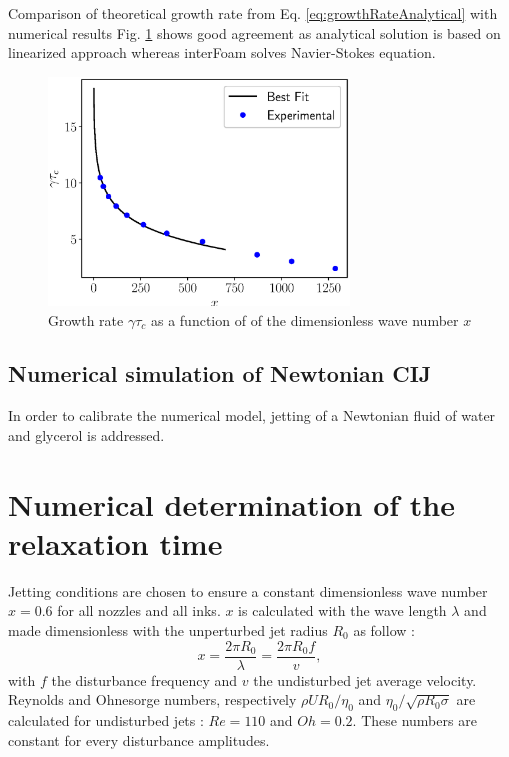 \documentclass[twocolumn,10pt]{asme2ej}
\begin{document}
Comparison of theoretical growth rate from Eq. \ref{eq:growthRateAnalytical} with numerical results Fig. \ref{fig:growthrate} shows good agreement as analytical solution is based on linearized approach whereas interFoam solves Navier-Stokes equation.

\begin{figure}[]
    \centering
    \includegraphics[width=8cm]{dispersion1.eps}
    \caption{Growth rate $\gamma \tau_c$ as a function of of the dimensionless wave number $x$}
    \label{fig:growthrate}
\end{figure}

\subsection{Numerical simulation of Newtonian CIJ}
In order to calibrate the numerical model, jetting of a Newtonian fluid of water and glycerol is addressed. 


\section{Numerical determination of the relaxation time} \label{numericalDetermination}





Jetting conditions are chosen to ensure a constant dimensionless wave number $x=0.6$ for all nozzles and all inks. $x$ is calculated with the wave length $\lambda$ and made dimensionless with the unperturbed jet radius $R_0$ as follow :
\begin{equation}
  x=\frac{2 \pi R_0}{\lambda}=\frac{2 \pi R_0 f}{v},
\end{equation} 
with $f$ the disturbance frequency and $v$ the undisturbed jet average velocity. Reynolds and Ohnesorge numbers, respectively $\rho U R_0 / \eta_0$ and $\eta_0/\sqrt{\rho R_0 \sigma}$ are calculated for undisturbed jets : $Re=110$ and $Oh=0.2$. These numbers are constant for every disturbance amplitudes.
\end{document}
